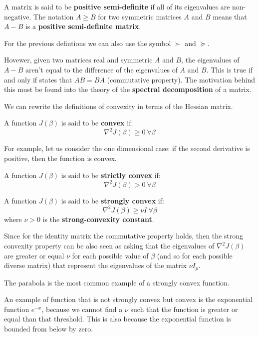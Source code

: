\begin{definition}
    A matrix is said to be \textbf{positive semi-definite} if all of its eigenvalues are non-negative. The notation $A \geq B$ for two symmetric matrices $A$ and $B$ means that $A-B$ is a \textbf{positive semi-definite matrix}.
\end{definition}
For the previous defintions we can also use the symbol $\succ$ and $\succeq$.

Hovewer, given two matrices real and symmetric $A$ and $B$, the eigenvalues of $A-B$ aren't equal to the difference of the eigenvalues of $A$ and $B$. This is true if and only if states that $AB=BA$ (commutative property). The motivation behind this must be found into the theory of the \textbf{spectral decomposition} of a matrix.

We can rewrite the definitions of convexity in terms of the Hessian matrix.
\begin{definition}
    A function $J(\beta)$ is said to be \textbf{convex} if:
    \[
        \nabla^2 J(\beta) \geq 0 \ \forall \beta
    \]
\end{definition}

For example, let us consider the one dimensional case: if the second derivative is positive, then the function is convex.

\begin{definition}
    A function $J(\beta)$ is said to be \textbf{strictly convex} if:
    \[
        \nabla^2 J(\beta) > 0 \ \forall \beta
    \]
\end{definition}

\begin{definition}
    A function $J(\beta)$ is said to be \textbf{strongly convex} if:
    \[
        \nabla^2 J(\beta) \geq \nu I \ \forall \beta
    \]
    where $\nu > 0$ is the \textbf{strong-convexity constant}.
\end{definition}

Since for the identity matrix the commutative property holds, then the strong convexity property can be also seen as asking that the eigenvalues of $\nabla^2 J(\beta)$ are greater or equal $\nu$ for each possible value of $\beta$ (and so for each possible diverse matrix) that represent the eigenvalues of the matrix $\nu I_p$.

The parabola is the most common example of a strongly convex function.

An example of function that is not strongly convex but convex is the exponential function $e^{-x}$, because we cannot find a $\nu$ such that the function is greater or equal than that threshold. This is also because the exponential function is bounded from below by zero.

